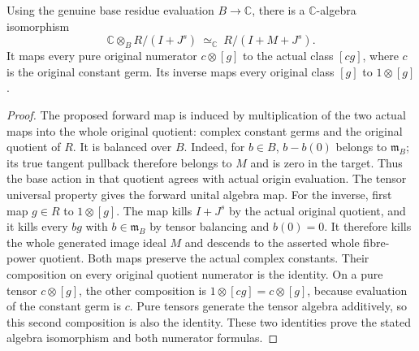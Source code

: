 \begin{theorem}
\label{hir:relative-normal-original-fibre-tensor-algebra}
\leanok
{}
Using the genuine base residue evaluation $B\to\mathbb C$, there is a
$\mathbb C$-algebra isomorphism
\[
 \mathbb C\otimes_B R/(I+J^s)\ \simeq_{\mathbb C}\ R/(I+M+J^s).
\]
It maps every pure original numerator $c\otimes[g]$ to the actual class
$[cg]$, where $c$ is the original constant germ. Its inverse maps every
original class $[g]$ to $1\otimes[g]$.
\end{theorem}
\begin{proof}
The proposed forward map is induced by multiplication of the two actual
maps into the whole original quotient: complex constant germs and the
original quotient of $R$. It is balanced over $B$. Indeed, for $b\in B$,
$b-b(0)$ belongs to $\mathfrak m_B$; its true tangent pullback therefore
belongs to $M$ and is zero in the target. Thus the base action in that
quotient agrees with actual origin evaluation. The tensor universal
property gives the forward unital algebra map.
For the inverse, first map $g\in R$ to $1\otimes[g]$. The map kills
$I+J^s$ by the actual original quotient, and it kills every $bg$ with
$b\in\mathfrak m_B$ by tensor balancing and $b(0)=0$. It therefore
kills the whole generated image ideal $M$ and descends to the asserted
whole fibre-power quotient. Both maps preserve the actual complex constants.
Their composition on every original quotient numerator is the identity.
On a pure tensor $c\otimes[g]$, the other composition is
$1\otimes[cg]=c\otimes[g]$, because evaluation of the constant germ is
$c$. Pure tensors generate the tensor algebra additively, so this second
composition is also the identity. These two identities prove the stated
algebra isomorphism and both numerator formulas.
\end{proof}

